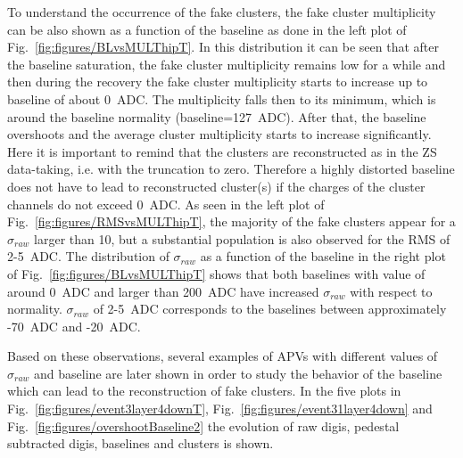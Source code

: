 To understand the occurrence of the fake clusters, the fake cluster multiplicity can be also shown as a function of the baseline as done in the left plot of Fig.~\ref{fig:figures/BLvsMULThipT}. In this distribution it can be seen that after the baseline saturation, the fake cluster multiplicity remains low for a while and then during the recovery the fake cluster multiplicity starts to increase up to baseline of about 0~ADC. The multiplicity falls then to its minimum, which is around the baseline normality (baseline=127~ADC). After that, the baseline overshoots and the average cluster multiplicity starts to increase significantly. Here it is important to remind that the clusters are reconstructed as in the ZS data-taking, i.e. with the truncation to zero. Therefore a highly distorted baseline does not have to lead to reconstructed cluster(s) if the charges of the cluster channels do not exceed 0~ADC.  As seen in the left plot of Fig.~\ref{fig:figures/RMSvsMULThipT}, the majority of the fake clusters appear for a $\sigma_{raw}$ larger than 10, but a substantial population is also observed for the RMS of 2-5~ADC. The distribution of  $\sigma_{raw}$ as a function of the baseline in the right plot of Fig.~\ref{fig:figures/BLvsMULThipT} shows that both baselines with value of around 0~ADC and larger than 200~ADC have increased $\sigma_{raw}$ with respect to normality. $\sigma_{raw}$ of 2-5~ADC corresponds to the baselines between approximately -70~ADC and -20~ADC. 

Based on these observations, several examples of APVs with different values of $\sigma_{raw}$ and baseline are later shown in order to study the behavior of the baseline which can lead to the reconstruction of fake clusters. In the five plots in Fig.~\ref{fig:figures/event3layer4downT},  Fig.~\ref{fig:figures/event31layer4down} and Fig.~\ref{fig:figures/overshootBaseline2} the evolution of raw digis, pedestal subtracted digis, baselines and clusters is shown. 

